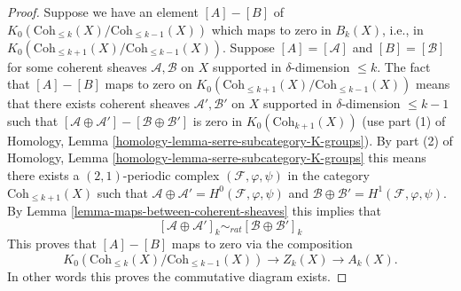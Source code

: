 \begin{proof}
Suppose we have an element $[A] - [B]$ of
$K_0(\text{Coh}_{\leq k}(X)/\text{Coh}_{\leq k - 1}(X))$
which maps to zero in $B_k(X)$, i.e., in
$K_0(\text{Coh}_{\leq k + 1}(X)/\text{Coh}_{\leq k - 1}(X))$.
Suppose $[A] = [\mathcal{A}]$ and $[B] = [\mathcal{B}]$
for some coherent sheaves $\mathcal{A}, \mathcal{B}$ on
$X$ supported in $\delta$-dimension $\leq k$.
The fact that $[A] - [B]$ maps to zero on
$K_0(\text{Coh}_{\leq k + 1}(X)/\text{Coh}_{\leq k - 1}(X))$
means that there exists coherent sheaves
$\mathcal{A}', \mathcal{B}'$ on $X$ supported in
$\delta$-dimension $\leq k - 1$ such that
$[\mathcal{A} \oplus \mathcal{A}'] - [\mathcal{B} \oplus \mathcal{B}']$
is zero in $K_0(\text{Coh}_{k + 1}(X))$ (use part (1) of
Homology, Lemma \ref{homology-lemma-serre-subcategory-K-groups}).
By part (2) of
Homology, Lemma \ref{homology-lemma-serre-subcategory-K-groups}
this means there exists a $(2, 1)$-periodic complex
$(\mathcal{F}, \varphi, \psi)$ in the category $\text{Coh}_{\leq k + 1}(X)$
such that
$\mathcal{A} \oplus \mathcal{A}' = H^0(\mathcal{F}, \varphi, \psi)$
and $\mathcal{B} \oplus \mathcal{B}' = H^1(\mathcal{F}, \varphi, \psi)$.
By Lemma \ref{lemma-maps-between-coherent-sheaves}
this implies that
$$
[\mathcal{A} \oplus \mathcal{A}']_k
\sim_{rat}
[\mathcal{B} \oplus \mathcal{B}']_k
$$
This proves that $[A] - [B]$ maps to zero via the composition
$$
K_0(\text{Coh}_{\leq k}(X)/\text{Coh}_{\leq k - 1}(X))
\longrightarrow Z_k(X)
\longrightarrow A_k(X).
$$
In other words this proves the
commutative diagram exists.


\end{proof}
